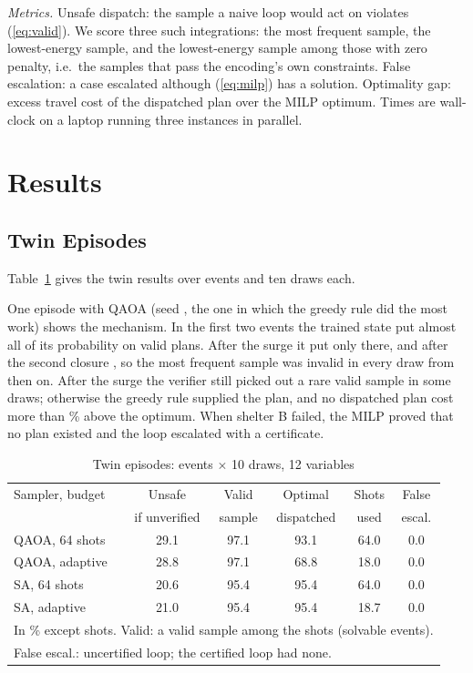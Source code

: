 \documentclass[conference]{IEEEtran}
\begin{document}
\textit{Metrics.} Unsafe dispatch: the sample a naive loop would act on violates (\ref{eq:valid}). We score three such integrations: the most frequent sample, the lowest-energy sample, and the lowest-energy sample among those with zero penalty, i.e.\ the samples that pass the encoding's own constraints. False escalation: a case escalated although (\ref{eq:milp}) has a solution. Optimality gap: excess travel cost of the dispatched plan over the MILP optimum. Times are wall-clock on a laptop running three instances in parallel. 

\section{Results}
\subsection{Twin Episodes}\label{sec:twin}
Table~\ref{tab:twin} gives the twin results over \TwinEvents{} events and ten draws each. \TwinText{} \StatText{}

One episode with QAOA (seed \TraceSeedNo, the one in which the greedy rule did the most work) shows the mechanism. In the first two events the trained state put almost all of its probability on valid plans. After the surge it put only \TracePfTwo{} there, and after the second closure \TracePfThree{}, so the most frequent sample was invalid in every draw from then on. After the surge the verifier still picked out a rare valid sample in some draws; otherwise the greedy rule supplied the plan, and no dispatched plan cost more than \TraceGreedyGap\% above the optimum. When shelter B failed, the MILP proved that no plan existed and the loop escalated with a certificate.



\begin{table}[t]
\caption{Twin episodes: \TwinEvents{} events $\times$ 10 draws, 12 variables}
\label{tab:twin}
\centering
\footnotesize
\setlength{\tabcolsep}{2.2pt}
\begin{tabular}{lccccc}
\toprule
Sampler, budget & Unsafe & Valid & Optimal & Shots & False\\
 & if unverified & sample & dispatched & used & escal.\\
\midrule
QAOA, 64 shots & 29.1 & 97.1 & 93.1 & 64.0 & 0.0\\
QAOA, adaptive & 28.8 & 97.1 & 68.8 & 18.0 & 0.0\\
SA, 64 shots & 20.6 & 95.4 & 95.4 & 64.0 & 0.0\\
SA, adaptive & 21.0 & 95.4 & 95.4 & 18.7 & 0.0\\
\bottomrule
\multicolumn{6}{l}{\scriptsize In \% except shots. Valid: a valid sample among the shots (solvable events).}\\
\multicolumn{6}{l}{\scriptsize False escal.: uncertified loop; the certified loop had none.}\\
\end{tabular}
\end{table}
\end{document}
